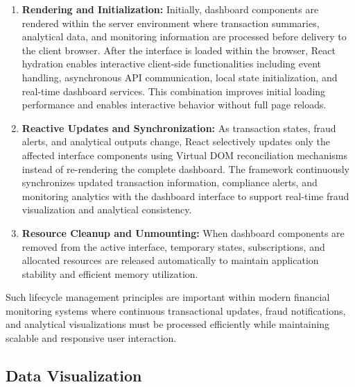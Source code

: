 {%
\renewcommand{\theenumi}{\arabic{enumi}}%
\renewcommand{\labelenumi}{\theenumi.}%
\begin{enumerate}
    \item \textbf{Rendering and Initialization:}
        Initially, dashboard components are rendered within the server environment where transaction summaries, analytical data, and monitoring information are processed before delivery to the client browser. After the interface is loaded within the browser, React hydration enables interactive client-side functionalities including event handling, asynchronous API communication, local state initialization, and real-time dashboard services. This combination improves initial loading performance and enables interactive behavior without full page reloads.

    \item \textbf{Reactive Updates and Synchronization:}
        As transaction states, fraud alerts, and analytical outputs change, React selectively updates only the affected interface components using Virtual DOM reconciliation mechanisms instead of re-rendering the complete dashboard. The framework continuously synchronizes updated transaction information, compliance alerts, and monitoring analytics with the dashboard interface to support real-time fraud visualization and analytical consistency.

    \item \textbf{Resource Cleanup and Unmounting:}
        When dashboard components are removed from the active interface, temporary states, subscriptions, and allocated resources are released automatically to maintain application stability and efficient memory utilization.
\end{enumerate}%
}

\vspace{0.2cm}

Such lifecycle management principles are important within modern financial monitoring systems where continuous transactional updates, fraud notifications, and analytical visualizations must be processed efficiently while maintaining scalable and responsive user interaction.

\subsection[Data Visualization]{\textbf{Data Visualization}}


